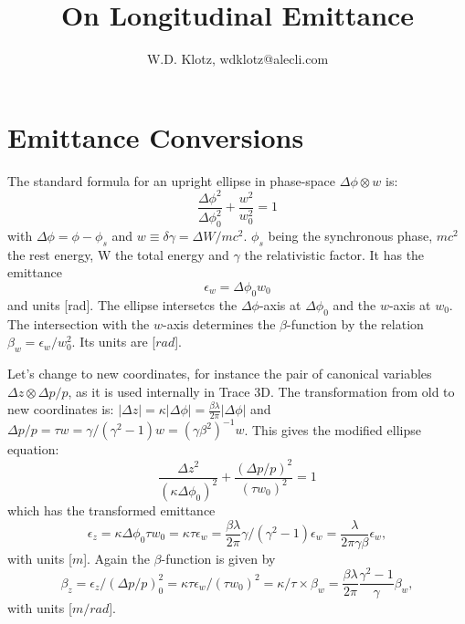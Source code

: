 \documentclass{article}
\title{On Longitudinal Emittance}
\author{W.D. Klotz, wdklotz@alecli.com}
\begin{document}
\maketitle

\section{Emittance Conversions}
The standard formula for an upright ellipse in phase-space $\Delta\phi\otimes w$ is:
\begin{equation}
\frac{\Delta\phi^{2}}{\Delta\phi_{0}^{2}}+\frac{w^{2}}{w_{0}^{2}}=1 \label{}
\end{equation}
with $ \Delta\phi = \phi - \phi_{s} $ and $ w \equiv \delta\gamma = \Delta W/mc^{2} $.
$ \phi_{s} $ being the synchronous phase, $ mc^{2} $ the rest energy, W the total energy and $ \gamma $ the relativistic factor.
It has the emittance
\begin{equation}
\epsilon_{w} = \Delta\phi_{0}w_{0} \label{}
\end{equation}
and units [rad].
The ellipse intersetcs the $ \Delta\phi $-axis at $ \Delta\phi_{0} $ and the $ w $-axis at $ w_{0} $.
The intersection with the $w$-axis determines the $\beta$-function by the relation $\beta_{w} = \epsilon_{w}/w_{0}^{2}$. Its units are
[$rad$].

Let's change to new coordinates, for instance the pair of canonical variables   $ \Delta z\otimes \Delta p/p $, as it is used internally in Trace 3D.
The transformation from old to new coordinates is:
$ |\Delta z| = \kappa|\Delta\phi| =  \frac{\beta \lambda} {2 \pi}  |\Delta\phi| $ and $ \Delta p/p = \tau w = \gamma/(\gamma^{2}-1) w = (\gamma \beta^{2})^{-1} w $.
This gives the modified ellipse equation:
\begin{equation}
\frac{\Delta z^{2}}{{(\kappa\Delta\phi_{0})}^{2}}+\frac{(\Delta p/p)^{2}}{{(\tau w_{0})^{2}}}=1 \label{}
\end{equation}
which has the transformed emittance 
\begin{equation}
\epsilon_{z} =  \kappa\Delta\phi_{0}\tau w_{0} = \kappa\tau\epsilon_{w} = \frac{\beta \lambda} {2 \pi} \gamma/(\gamma^{2}-1) \epsilon_{w} = \frac{\lambda} {2 \pi \gamma \beta} \epsilon_{w}\label{},
\end{equation}
with units [$m$]. Again the $\beta$-function is given by 
\begin{equation}
\beta_{z}=\epsilon_{z}/(\Delta p/p)_{0}^{2}=\kappa\tau\epsilon_{w}/(\tau w_{0})^2=\kappa/\tau\times\beta_{w}=\frac{\beta \lambda}{2 \pi}\frac{\gamma^2-1}{\gamma}\beta_{w},
\end{equation}
with units [$m/rad$].
\end{document}
